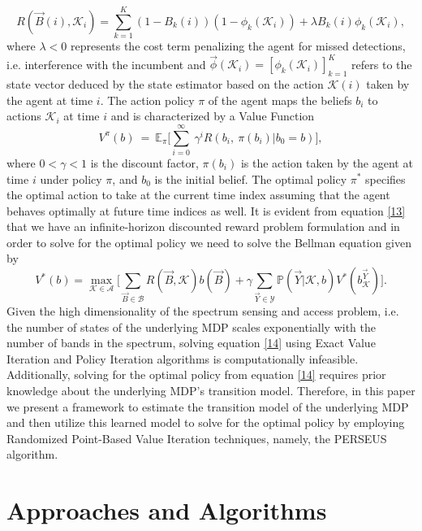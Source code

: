 \documentclass[10pt,twocolumn]{IEEEtran}
\begin{document}
\begin{equation}\label{12}
    R(\vec{B}(i),\mathcal{K}_i)=\sum_{k=1}^{K}(1-B_k(i))(1-\phi_k(\mathcal{K}_{i}))+\lambda B_k(i)\phi_k(\mathcal{K}_{i}),
\end{equation}
where $\lambda < 0$ represents the cost term penalizing the agent for missed detections, i.e. interference with the incumbent and $\vec{\phi}(\mathcal{K}_i)=[\phi_k(\mathcal{K}_i)]_{k=1}^{K}$ refers to the state vector deduced by the state estimator based on the action $\mathcal{K}(i)$ taken by the agent at time $i$. The action policy $\pi$ of the agent maps the beliefs $b_i$ to actions $\mathcal{K}_i$ at time $i$ and is characterized by a Value Function
\begin{equation}\label{13}
    V^{\pi}(b)\ =\ \mathbb{E}_{\pi}\Big[\sum_{i=0}^{\infty}\ \gamma^i R(b_i,\ \pi(b_i)|b_0=b)\Big],
\end{equation}
where $0 < \gamma < 1$ is the discount factor, $\pi(b_i)$ is the action taken by the agent at time $i$ under policy $\pi$, and $b_0$ is the initial belief. The optimal policy $\pi^*$ specifies the optimal action to take at the current time index assuming that the agent behaves optimally at future time indices as well. It is evident from equation \eqref{13} that we have an infinite-horizon discounted reward problem formulation and in order to solve for the optimal policy we need to solve the Bellman equation given by
\begin{equation}\label{14}
    V^*(b)=\max_{\mathcal{K}\in\mathcal{A}}\Big[\sum_{\vec{B}\in\mathcal{B}}R(\vec{B},\mathcal{K})b(\vec{B})+\gamma \sum_{\vec{Y}\in\mathcal{Y}}\mathbb{P}(\vec{Y}|\mathcal{K},b)V^*(b_{\mathcal{K}}^{\vec{Y}})\Big].
\end{equation}
Given the high dimensionality of the spectrum sensing and access problem, i.e. the number of states of the underlying MDP scales exponentially with the number of bands in the spectrum, solving equation \eqref{14} using Exact Value Iteration and Policy Iteration algorithms is computationally infeasible. Additionally, solving for the optimal policy from equation \eqref{14} requires prior knowledge about the underlying MDP's transition model. Therefore, in this paper we present a framework to estimate the transition model of the underlying MDP and then utilize this learned model to solve for the optimal policy by employing Randomized Point-Based Value Iteration techniques, namely, the PERSEUS algorithm.
\section{Approaches and Algorithms}
\end{document}
